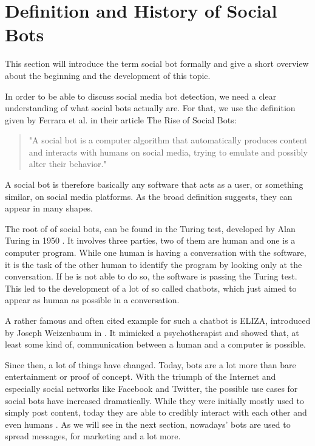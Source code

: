 
\section{Definition and History of Social Bots} 
This section will introduce the term social bot formally and give a short overview about the beginning and the development of this topic.

In order to be able to discuss social media bot detection, we need a clear understanding of what social bots actually are.  For that, we use the definition given by Ferrara et al. in their article The Rise of Social Bots:
\begin{quote}
	"A social bot is a computer algorithm that automatically produces content and interacts with humans on social media, trying to emulate and possibly alter their behavior." \cite{ferrara15}
\end{quote}

A social bot is therefore basically any software that acts as a user, or something similar, on social media platforms. As the broad definition suggests, they can appear in many shapes.

The root of of social bots, can be found in the Turing test, developed by Alan Turing in 1950 \cite{turing}. It involves three parties, two of them are human and one is a computer program. While one human is having a conversation with the software, it is the task of the other human to identify the program by looking only at the conversation. If he is not able to do so, the software is passing the Turing test. This led to the development of a lot of so called chatbots, which just aimed to appear as human as possible in a conversation.  

A rather famous and often cited example for such a chatbot is ELIZA, introduced by Joseph Weizenbaum in \cite{eliza}. It mimicked a psychotherapist and showed that, at least some kind  of, communication between a human and a computer is possible.

Since then, a lot of things have changed. Today, bots are a lot more than bare entertainment or proof of concept. With the triumph of the Internet and especially social networks like Facebook and Twitter, the possible use cases for social bots have increased dramatically. While they were initially mostly used to simply post content, today they are able to credibly interact with each other and even humans \cite{boshmaf13, hwang12}. As we will see in the next section, nowadays' bots are used to spread messages, for marketing and a lot more.

